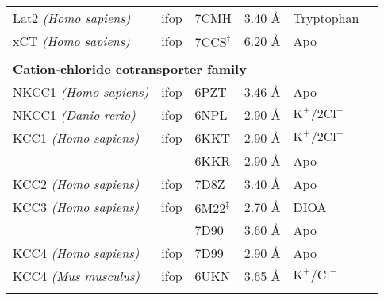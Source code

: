 \begin{center}
\begin{tabular}{l l l l l r}
Lat2 \emph{(Homo sapiens)} & \gls{ifop} & 7CMH & 3.40 \AA & Tryptophan & \citep*{Yan2020} \\
xCT \emph{(Homo sapiens)} & \gls{ifop} & $\mathrm{7CCS^{\dagger}}$ & 6.20 \AA & Apo & \citep*{Oda2020} \\
\\
\multicolumn{5}{l}{\textbf{Cation-chloride cotransporter family}} \\
NKCC1 \emph{(Homo sapiens)} & \gls{ifop} & 6PZT & 3.46 \AA & Apo & \citep*{Yang2020} \\
NKCC1 \emph{(Danio rerio)} & \gls{ifop} & 6NPL & 2.90 \AA & $\mathrm{K^+/2Cl^-}$ & \citep*{Chew2019} \\
KCC1 \emph{(Homo sapiens)} & \gls{ifop} & 6KKT & 2.90 \AA & $\mathrm{K^+/2Cl^-}$ & \citep*{Liu2019} \\
& & 6KKR & 2.90 \AA &  Apo & \citep*{Liu2019} \\
KCC2 \emph{(Homo sapiens)} & \gls{ifop} & 7D8Z & 3.40 \AA & Apo & \citep*{Xie2020} \\
KCC3 \emph{(Homo sapiens)} & \gls{ifop} & $\mathrm{6M22^{\ddagger}}$ & 2.70 \AA & DIOA & \citep*{Chi2021} \\
& & 7D90 & 3.60 \AA & Apo & \citep*{Xie2020} \\
KCC4 \emph{(Homo sapiens)} & \gls{ifop} & 7D99 & 2.90 \AA & Apo & \citep*{Xie2020} \\
KCC4 \emph{(Mus musculus)} & \gls{ifop} & 6UKN & 3.65 \AA & $\mathrm{K^+/Cl^-}$ & \citep*{Reid2020} \\
\bottomrule \\
\end{tabular} 
\end{center}